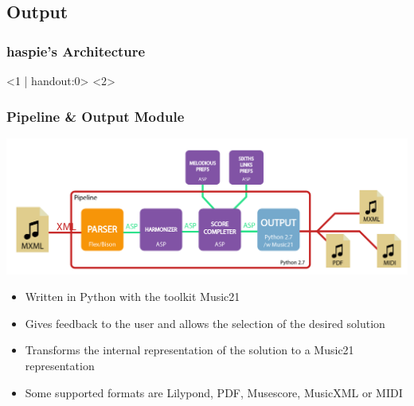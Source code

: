 \documentclass[english,fragile]{beamer}
\begin{document}
\subsection{Output}
	\begin{frame}
		\frametitle{haspie's Architecture}
		\begin{center}
		<1 | handout:0>
		<2>
		\end{center}
	\end{frame}
		\begin{frame}[t]
		\frametitle{Pipeline \& Output Module}
		\begin{center}
				\includegraphics[width=0.6\linewidth]{imagenes/arch_trans/arquitectura_final_pipe-01.png}
				\end{center}
			\begin{itemize}
				\item Written in \alert{Python} with the toolkit \alert{Music21}
                \item Gives feedback to the user and allows the selection of the desired solution
				\item Transforms the internal representation of the solution to a Music21 representation
				\item Some supported formats are Lilypond, PDF, Musescore, MusicXML or MIDI
			\end{itemize}
\end{frame}
\end{document}
